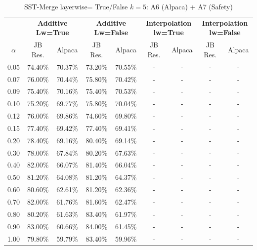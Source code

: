 \begin{table}[h]
\centering
\caption{SST-Merge layerwise= True/False $k=5$: A6 (Alpaca) + A7 (Safety)}
\label{tab:res_a6_sst_5}
\begin{tabular}{c|cc|cc|cc|cc}
\hline
 & \multicolumn{2}{c|}{\textbf{Additive Lw=True}} & \multicolumn{2}{c|}{\textbf{Additive Lw=False}} & \multicolumn{2}{c|}{\textbf{Interpolation lw=True}}& \multicolumn{2}{c}{\textbf{Interpolation lw=False}} \\
$\alpha$ & JB Res. & Alpaca & JB Res. & Alpaca & JB Res. & Alpaca & JB Res. & Alpaca \\
\hline
0.05 & 74.40\% & 70.37\% & 73.20\% & 70.55\% & - & - & - & - \\
0.07 & 76.00\% & 70.44\% & 75.80\% & 70.42\% & - & - & - & - \\
0.09 & 75.40\% & 70.16\% & 75.40\% & 70.53\% & - & - & - & - \\
0.10 & 75.20\% & 69.77\% & 75.80\% & 70.04\% & - & - & - & - \\
0.12 & 76.00\% & 69.86\% & 74.60\% & 69.80\% & - & - & - & - \\
0.15 & 77.40\% & 69.42\% & 77.40\% & 69.41\% & - & - & - & - \\
0.20 & 78.40\% & 69.16\% & 80.40\% & 69.14\% & - & - & - & - \\
0.30 & 78.00\% & 67.84\% & 80.20\% & 67.63\% & - & - & - & - \\
0.40 & 82.00\% & 66.07\% & 81.40\% & 66.04\% & - & - & - & - \\
0.50 & 81.20\% & 64.08\% & 81.20\% & 64.37\% & - & - & - & - \\
0.60 & 80.60\% & 62.61\% & 81.20\% & 62.36\% & - & - & - & - \\
0.70 & 82.00\% & 61.76\% & 81.60\% & 62.47\% & - & - & - & - \\
0.80 & 80.20\% & 61.63\% & 83.40\% & 61.97\% & - & - & - & - \\
0.90 & 83.00\% & 60.66\% & 84.00\% & 61.45\% & - & - & - & - \\
1.00 & 79.80\% & 59.79\% & 83.40\% & 59.96\% & - & - & - & - \\
\hline
\end{tabular}
\end{table}
\FloatBarrier

